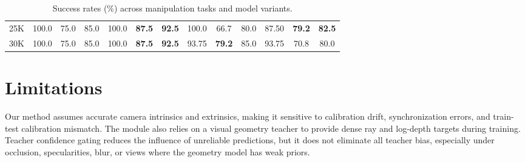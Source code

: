 \documentclass{article}
\newcommand{\todo}[1]{\textcolor{red}{TODO: #1}}
\begin{document}
\begin{table}[H]
\begin{tabular}{l|ccc|ccc|ccc|ccc}
25K
& 100.0 & 75.0 & 85.0
& 100.0 & \textbf{87.5} & \textbf{92.5}
& 100.0 & 66.7 & 80.0
& 87.50 & \textbf{79.2} & \textbf{82.5} \\

30K
& 100.0 & 75.0 & 85.0
& 100.0 & \textbf{87.5} & \textbf{92.5}
& 93.75 & \textbf{79.2} & 85.0
& 93.75 & 70.8 & 80.0 \\
\bottomrule
\end{tabular}
\caption{
Success rates (\%) across manipulation tasks and model variants.}
\label{tab:real_robot_res}
\vspace{-.8 cm}
\end{table}



\section{Limitations}
\label{sec:limitations}
Our method assumes accurate camera intrinsics and extrinsics, making it sensitive to calibration drift, synchronization errors, and train-test calibration mismatch. The module also relies on a visual geometry teacher to provide dense ray and log-depth targets during training. Teacher confidence gating reduces the influence of unreliable predictions, but it does not eliminate all teacher bias, especially under occlusion, specularities, blur, or views where the geometry model has weak priors.
\end{document}
